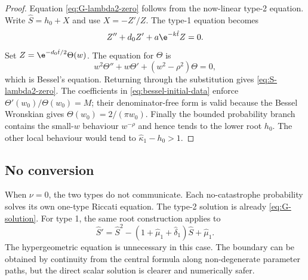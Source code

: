 \begin{proof}
Equation \eqref{eq:G-lambda2-zero} follows from the now-linear type-2 equation. Write $\widehat S=h_0+X$ and use $X=-Z'/Z$. The type-1 equation becomes
\[
Z''+d_0Z'+a\e^{-k\hat t}Z=0.
\]
Set $Z=\e^{-d_0\hat t/2}\Theta(w)$. The equation for $\Theta$ is
\[
w^2\Theta''+w\Theta'+(w^2-\rho^2)\Theta=0,
\]
which is Bessel's equation. Returning through the substitution gives \cref{eq:S-lambda2-zero}. The coefficients in \cref{eq:bessel-initial-data} enforce $\Theta'(w_0)/\Theta(w_0)=M$; their denominator-free form is valid because the Bessel Wronskian gives $\Theta(w_0)=2/(\pi w_0)$. Finally the bounded probability branch contains the small-$w$ behaviour $w^{-\rho}$ and hence tends to the lower root $h_0$. The other local behaviour would tend to $\hat\kappa_1-h_0>1$.
\end{proof}

\subsection{No conversion}

When $\nu=0$, the two types do not communicate. Each no-catastrophe probability solves its own one-type Riccati equation. The type-2 solution is already \cref{eq:G-solution}. For type 1, the same root construction applies to
\[
\widehat S'=\widehat S^2
-(1+\hat\mu_1+\hat\delta_1)\widehat S+\hat\mu_1.
\]
The hypergeometric equation is unnecessary in this case. The boundary can be obtained by continuity from the central formula along non-degenerate parameter paths, but the direct scalar solution is clearer and numerically safer.
